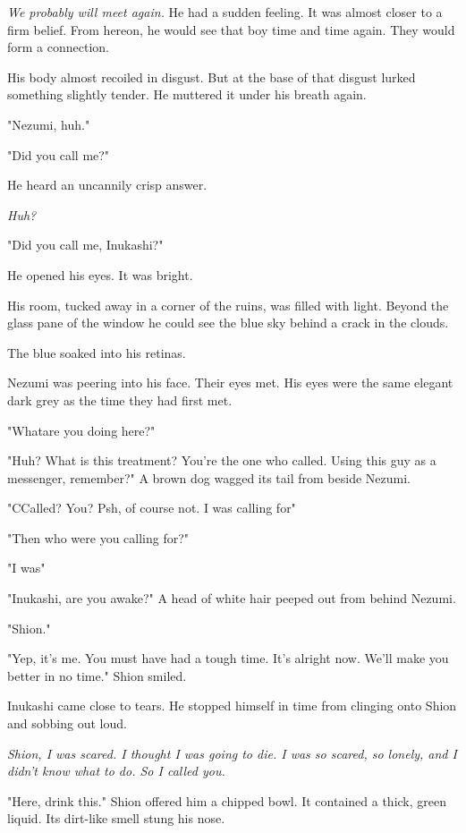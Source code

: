 \emph{We probably will meet again.} He had a sudden feeling. It was almost
closer to a firm belief. From hereon, he would see that boy time and
time again. They would form a connection.

His body almost recoiled in disgust. But at the base of that disgust
lurked something slightly tender. He muttered it under his breath again.

"Nezumi, huh."

\mybreak

"Did you call me?"

He heard an uncannily crisp answer.

\emph{Huh?}

"Did you call me, Inukashi?"

He opened his eyes. It was bright.

His room, tucked away in a corner of the ruins, was filled with light.
Beyond the glass pane of the window he could see the blue sky behind a
crack in the clouds.

The blue soaked into his retinas.

Nezumi was peering into his face. Their eyes met. His eyes were the same
elegant dark grey as the time they had first met.

"\el What\el are you doing here\el ?"

"Huh? What is this treatment? You're the one who called. Using this guy
as a messenger, remember?" A brown dog wagged its tail from beside
Nezumi.

"C\el Called? You? Psh, of course not. I was calling for\el "

"Then who were you calling for?"

"I was\el "

"Inukashi, are you awake?" A head of white hair peeped out from behind
Nezumi.

"Shion."

"Yep, it's me. You must have had a tough time. It's alright now. We'll
make you better in no time." Shion smiled.

Inukashi came close to tears. He stopped himself in time from clinging
onto Shion and sobbing out loud.

\emph{Shion, I was scared. I thought I was going to die. I was so scared, so
lonely, and I didn't know what to do. So I called you.}

"Here, drink this." Shion offered him a chipped bowl. It contained a
thick, green liquid. Its dirt-like smell stung his nose.


